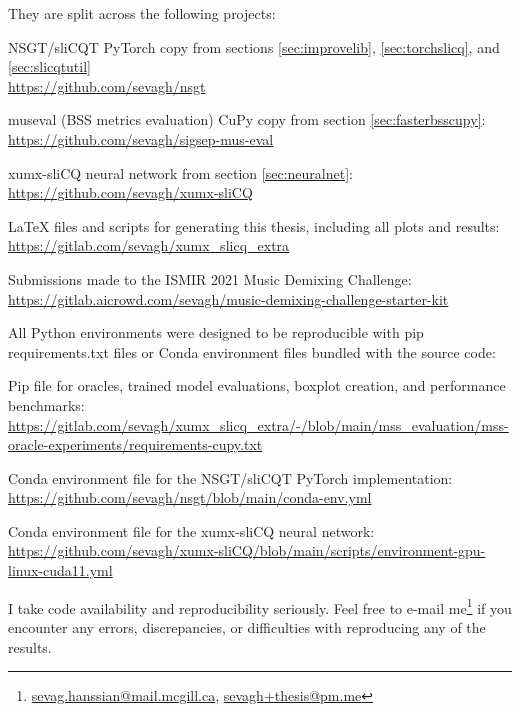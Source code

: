 \documentclass[report.tex]{subfiles}
\begin{document}
\begin{appendices}
They are split across the following projects:
\begin{tight_enumerate}
	\item
		NSGT/sliCQT PyTorch copy from sections \ref{sec:improvelib}, \ref{sec:torchslicq}, and \ref{sec:slicqtutil}\\
		\url{https://github.com/sevagh/nsgt}
	\item
		museval (BSS metrics evaluation) CuPy copy from section \ref{sec:fasterbsscupy}:\\
		\url{https://github.com/sevagh/sigsep-mus-eval}
	\item
		xumx-sliCQ neural network from section \ref{sec:neuralnet}:\\
		\url{https://github.com/sevagh/xumx-sliCQ}
	\item
		LaTeX files and scripts for generating this thesis, including all plots and results:\\
		\url{https://gitlab.com/sevagh/xumx_slicq_extra}
	\item
		Submissions made to the ISMIR 2021 Music Demixing Challenge:\\
		\url{https://gitlab.aicrowd.com/sevagh/music-demixing-challenge-starter-kit}
\end{tight_enumerate}

All Python environments were designed to be reproducible with pip requirements.txt files or Conda environment files bundled with the source code:

\begin{tight_enumerate}
	\item
		Pip file for oracles, trained model evaluations, boxplot creation, and performance benchmarks:\\
		\url{https://gitlab.com/sevagh/xumx_slicq_extra/-/blob/main/mss_evaluation/mss-oracle-experiments/requirements-cupy.txt}
	\item
		Conda environment file for the NSGT/sliCQT PyTorch implementation:\\
		\url{https://github.com/sevagh/nsgt/blob/main/conda-env.yml}
	\item
		Conda environment file for the xumx-sliCQ neural network:\\
		\href{https://github.com/sevagh/xumx-sliCQ/blob/main/scripts/environment-gpu-linux-cuda11.yml}{https://github.com/sevagh/xumx-sliCQ/blob/main/scripts/environment-gpu-linux-cuda11.yml}
\end{tight_enumerate}

I take code availability and reproducibility seriously. Feel free to e-mail me\footnote{\href{mailto:sevag.hanssian@mail.mcgill.ca}{sevag.hanssian@mail.mcgill.ca}, \href{mailto:sevagh+thesis@pm.me}{sevagh+thesis@pm.me}} if you encounter any errors, discrepancies, or difficulties with reproducing any of the results.

\end{appendices}
\end{document}

